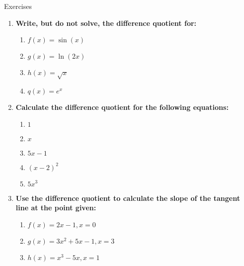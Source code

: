 \documentclass[../revisedmain.tex]{subfiles}
\begin{document}
	\begin{center}
		{\Large Exercises}
	\end{center}
	\begin{enumerate}
		\item \textbf{Write, but do not solve, the difference quotient for:}
		\begin{enumerate}
			\item \(f(x)=\sin(x)\)
			\item \(g(x)=\ln(2x)\)
			\item \(h(x)=\sqrt{x}\)
			\item \(q(x)=e^{x}\)
		\end{enumerate}
		\item \textbf{Calculate the difference quotient for the following equations:}
		\begin{enumerate}
			\item \(1\)
			\item \(x\)
			\item \(5x-1\)
			\item \((x-2)^2\)
			\item \(5x^3\)
		\end{enumerate}
		\item \textbf{Use the difference quotient to calculate the slope of the tangent line at the point given:}
		\begin{enumerate}
			\item \(f(x)=2x-1, x=0\)
			\item \(g(x)=3x^2+5x-1, x=3\)
			\item \(h(x)=x^3-5x, x=1\)
		\end{enumerate}
	\end{enumerate}
	\par
\end{document}
